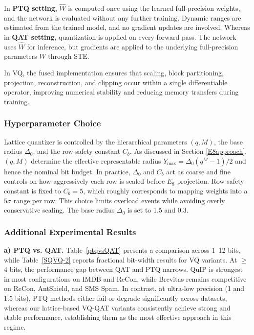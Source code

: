 \documentclass{article}
\theoremstyle{definition}
\theoremstyle{remark}
\begin{document}
\noindent In \textbf{PTQ setting}, $\widehat{W}$ is computed once using the learned full-precision weights, and the network is evaluated without any further training. Dynamic ranges are estimated from the trained model, and no gradient updates are involved. Whereas in \textbf{QAT setting}, quantization is applied on every forward pass. The network uses $\widehat{W}$ for inference, but gradients are applied to the underlying full-precision parameters $W$ through STE. 

In VQ, the fused implementation ensures that scaling, block partitioning, projection, reconstruction, and clipping occur within a single differentiable operator, improving numerical stability and reducing memory transfers during training.

\subsubsection{Hyperparameter Choice}

Lattice quantizer is controlled by the hierarchical parameters $(q,M)$, the base radius $\Delta_0$, and the row-safety constant $C_b$. As discussed in Section \ref{E8approach}, $(q,M)$ determine the effective representable radius $Y_{\max} = \Delta_0 (q^M - 1)/2$ and hence the nominal bit budget. In practice, $\Delta_0$ and $C_b$ act as coarse and fine controls on how aggressively each row is scaled before $E_8$ projection. Row-safety constant is fixed to $C_b = 5$, which roughly corresponds to mapping weights into a $5\sigma$ range per row. This choice limits overload events while avoiding overly conservative scaling. The base radius $\Delta_0$ is set to 1.5 and 0.3.


\subsubsection{Additional Experimental Results}
\noindent \textbf{a) PTQ vs. QAT.}
Table~\ref{ptqvsQAT} presents a comparison across 1–12 bits, while Table~\ref{SQVQ-2} reports fractional bit-width results for VQ variants. At $\geq$4 bits, the performance gap between QAT and PTQ narrows. QuIP is strongest in most configurations on IMDB and ReCon, while Brevitas remains competitive on ReCon, AntShield, and SMS Spam. In contrast, at ultra-low precision (1 and 1.5 bits), PTQ methods either fail or degrade significantly across datasets, whereas our lattice-based VQ-QAT variants consistently achieve strong and stable performance, establishing them as the most effective approach in this regime.
\end{document}
